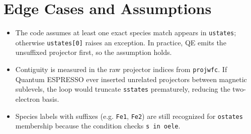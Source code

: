\documentclass[11pt]{article}
\begin{document}
\section{Edge Cases and Assumptions}
\begin{itemize}
  \item The code assumes at least one exact species match appears in \verb|ustates|; otherwise \verb|ustates[0]| raises an exception. In practice, QE emits the unsuffixed projector first, so the assumption holds.
  \item Contiguity is measured in the raw projector indices from \texttt{projwfc}. If Quantum ESPRESSO ever inserted unrelated projectors between magnetic sublevels, the loop would truncate \verb|sstates| prematurely, reducing the two-electron basis.
  \item Species labels with suffixes (e.g.	\texttt{Fe1}, \texttt{Fe2}) are still recognized for \verb|ostates| membership because the condition checks \verb|s in oele|.
\end{itemize}
\end{document}
